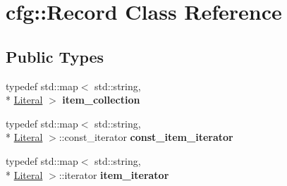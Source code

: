 \hypertarget{classcfg_1_1Record}{\section{cfg\-:\-:Record Class Reference}
\label{classcfg_1_1Record}
}
\subsection*{Public Types}
\begin{DoxyCompactItemize}
\item 
\hypertarget{classcfg_1_1Record_a4dfe770255cb176de77eca94b9f6ebc1}{typedef std\-::map$<$ std\-::string, \\*
\hyperlink{classcfg_1_1Literal}{Literal} $>$ {\bfseries item\-\_\-collection}}\label{classcfg_1_1Record_a4dfe770255cb176de77eca94b9f6ebc1}

\item 
\hypertarget{classcfg_1_1Record_a1a263360dc1953308854186fa7504a21}{typedef std\-::map$<$ std\-::string, \\*
\hyperlink{classcfg_1_1Literal}{Literal} $>$\-::const\-\_\-iterator {\bfseries const\-\_\-item\-\_\-iterator}}\label{classcfg_1_1Record_a1a263360dc1953308854186fa7504a21}

\item 
\hypertarget{classcfg_1_1Record_a7bd66456e3235536514e29b88a7944aa}{typedef std\-::map$<$ std\-::string, \\*
\hyperlink{classcfg_1_1Literal}{Literal} $>$\-::iterator {\bfseries item\-\_\-iterator}}\label{classcfg_1_1Record_a7bd66456e3235536514e29b88a7944aa}

\end{DoxyCompactItemize}
